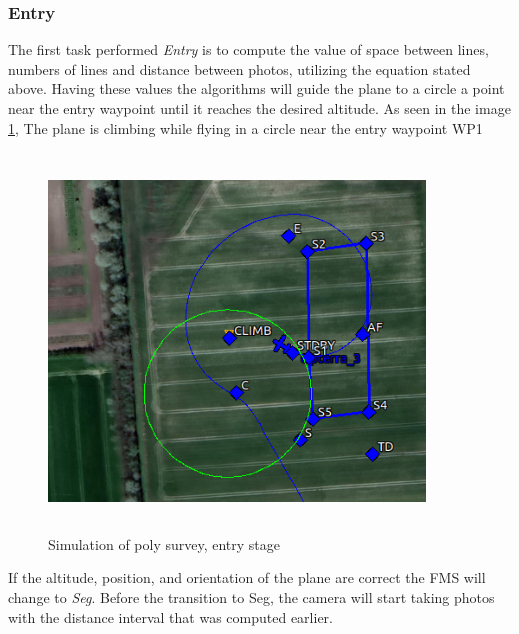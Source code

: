 \subsubsection{Entry}
The first task performed \textit{Entry} is to compute the value of space between lines, numbers of lines and distance between photos, utilizing the equation stated above.  Having these values the algorithms will guide the plane to a circle a point near the entry waypoint until it reaches the desired altitude. As seen in the image \ref{fig:entry_stage}, The plane is climbing while flying in a circle near the entry waypoint WP1
\begin{figure}[H]
\centering
\includegraphics[width=10cm,height=10cm,keepaspectratio]{imagenes/Entry.png}
\caption{Simulation of poly survey, entry stage}
\label{fig:entry_stage}
\end{figure}
If the altitude, position, and orientation of the plane are correct the FMS will change to \textit{Seg}. Before the transition to Seg, the camera will start taking photos with the distance interval that was computed earlier.
